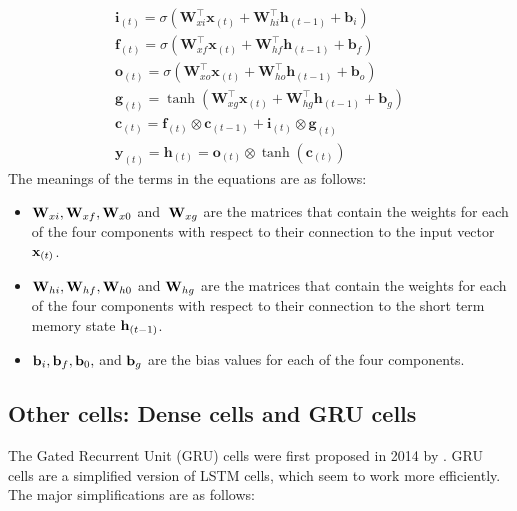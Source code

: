 \begin{equation} 
    \begin{array}{l}
    \mathbf{i}_{(t)}=\sigma\left(\mathbf{W}_{x i}^{\top} \mathbf{x}_{(t)}+\mathbf{W}_{h i}^{\top} \mathbf{h}_{(t-1)}+\mathbf{b}_{i}\right) \\
    \mathbf{f}_{(t)}=\sigma\left(\mathbf{W}_{x f}^{\top} \mathbf{x}_{(t)}+\mathbf{W}_{h f}^{\top} \mathbf{h}_{(t-1)}+\mathbf{b}_{f}\right) \\
    \mathbf{o}_{(t)}=\sigma\left(\mathbf{W}_{x o}^{\top} \mathbf{x}_{(t)}+\mathbf{W}_{h o}^{\top} \mathbf{h}_{(t-1)}+\mathbf{b}_{o}\right) \\
    \mathbf{g}_{(t)}=\tanh \left(\mathbf{W}_{x g}^{\top} \mathbf{x}_{(t)}+\mathbf{W}_{h g}^{\top} \mathbf{h}_{(t-1)}+\mathbf{b}_{g}\right) \\
    \mathbf{c}_{(t)}=\mathbf{f}_{(t)} \otimes \mathbf{c}_{(t-1)}+\mathbf{i}_{(t)} \otimes \mathbf{g}_{(t)} \\
    \mathbf{y}_{(t)}=\mathbf{h}_{(t)}=\mathbf{o}_{(t)} \otimes \tanh \left(\mathbf{c}_{(t)}\right)
    \end{array}
    \label{systemformula}
\end{equation}
The meanings of the terms in the equations are as follows:

\begin{itemize}
    \item  ${\bf W}_{xi} , {\bf W}_{xf} , {\bf W}_{x0}$ and $\: {\bf W}_{xg}$ are the matrices that contain the weights for each of the four components with respect to their connection to the input vector ${\bf x}_{(t)}$.
   
    \item ${\bf W}_{hi} , {\bf W}_{hf} , {\bf W}_{h0}$ and ${\bf W}_{hg}$ are the matrices that contain the weights for each of the four components with respect to their connection to the short term memory state ${\bf h}_{(t-1)}$.
    
    \item ${\bf b}_{i} , {\bf b}_{f}, {\bf b}_{0},$  and ${\bf b}_{g}$ are the bias values for each of the four components. 

\end{itemize}

\clearpage

\subsection{Other cells: Dense cells and GRU cells}
The Gated Recurrent Unit (GRU) cells were first proposed in 2014 by \citeauthor{DBLP:journals/corr/ChoMGBSB14} \autocite{DBLP:journals/corr/ChoMGBSB14}. GRU cells are a simplified version of LSTM cells, which seem to work more efficiently. The major simplifications are as follows:

